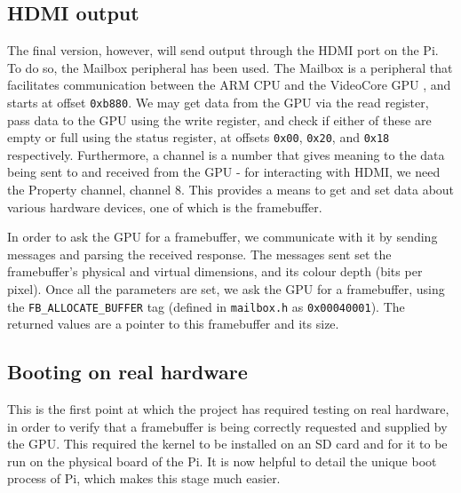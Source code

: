 \documentclass[10pt,a4paper]{article}
\newcommand{\code}[1]{\texttt{#1}}
\begin{document}
\subsection*{HDMI output}
The final version, however, will send output through the HDMI port on the Pi. To
do so, the Mailbox peripheral has been used. The Mailbox is a peripheral that
facilitates communication between the ARM CPU and the VideoCore GPU
\cite{Mailboxes}, and starts at offset \code{0xb880}. We may get data from the
GPU via the read register, pass data to the GPU using the write register, and
check if either of these are empty or full using the status register, at offsets
\code{0x00}, \code{0x20}, and \code{0x18} respectively. Furthermore, a channel
is a number that gives meaning to the data being sent to and received from the
GPU - for interacting with HDMI, we need the Property channel, channel 8. This
provides a means to get and set data about various hardware devices, one of
which is the framebuffer.

In order to ask the GPU for a framebuffer, we communicate with it by sending
messages and parsing the received response. The messages sent set the
framebuffer's physical and virtual dimensions, and its colour depth (bits per
pixel). Once all the parameters are set, we ask the GPU for a framebuffer, using
the \code{FB\_ALLOCATE\_BUFFER} tag (defined in \code{mailbox.h} as
\code{0x00040001}). The returned values are a pointer to this framebuffer and
its size. 

\subsection*{Booting on real hardware}
This is the first point at which the project has required testing on real
hardware, in order to verify that a framebuffer is being correctly requested and
supplied by the GPU. This required the kernel to be installed on an SD card and
for it to be run on the physical board of the Pi. It is now helpful to detail
the unique boot process of Pi, which makes this stage much easier.
\end{document}
